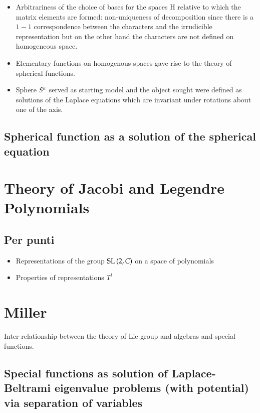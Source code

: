 \documentclass[oneside,12pt]{memoir}
\begin{document}
\begin{itemize}
\item Arbitrariness of the choice of bases for the spaces H relative to which the matrix elements are formed: non-uniqueness of decomposition since there is a $1-1$ correspondence between the characters and the irrudicible representation but on the other hand the characters are not defined on homogeneous space.
\item Elementary functions on homogenous spaces gave rise to the theory of spherical functions.
\item Sphere $S^{n}$ served as starting model and the object sought were defined as solutions of the Laplace equations which are invariant under rotations about one of the axis.
\end{itemize}

\section{Spherical function as a solution of the spherical equation}




\chapter{Theory of Jacobi and Legendre Polynomials}
\PartialToc

\section{Per punti}

\begin{itemize}
\item Representations of the group $\operatorname{SL}{(2,C)}$ on a space of polynomials
\item Properties of representations $T^l$
\end{itemize}

\chapter{Miller}
\PartialToc

Inter-relationship between the theory of Lie group and algebras and special functions.

\section{Special functions as solution of Laplace-Beltrami eigenvalue problems (with potential) via separation of variables}
\end{document}
